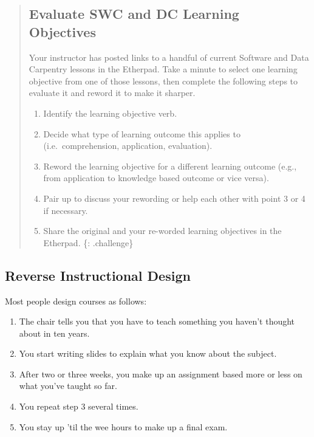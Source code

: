 \begin{quote}
\subsection{Evaluate SWC and DC Learning
Objectives}\label{evaluate-swc-and-dc-learning-objectives}

Your instructor has posted links to a handful of current Software and
Data Carpentry lessons in the Etherpad. Take a minute to select one
learning objective from one of those lessons, then complete the
following steps to evaluate it and reword it to make it sharper.

\begin{enumerate}
\def\labelenumi{\arabic{enumi}.}
\itemsep1pt\parskip0pt
\item
  Identify the learning objective verb.
\item
  Decide what type of learning outcome this applies to
  (i.e.~comprehension, application, evaluation).
\item
  Reword the learning objective for a different learning outcome (e.g.,
  from application to knowledge based outcome or vice versa).
\item
  Pair up to discuss your rewording or help each other with point 3 or 4
  if necessary.
\item
  Share the original and your re-worded learning objectives in the
  Etherpad. \{: .challenge\}
\end{enumerate}
\end{quote}

\subsection{Reverse Instructional
Design}\label{reverse-instructional-design}

Most people design courses as follows:

\begin{enumerate}
\def\labelenumi{\arabic{enumi}.}
\itemsep1pt\parskip0pt
\item
  The chair tells you that you have to teach something you haven't
  thought about in ten years.
\item
  You start writing slides to explain what you know about the subject.
\item
  After two or three weeks, you make up an assignment based more or less
  on what you've taught so far.
\item
  You repeat step 3 several times.
\item
  You stay up 'til the wee hours to make up a final exam.
\end{enumerate}

